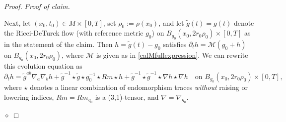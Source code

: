 \documentclass[12pt]{amsart}
\newcommand{\calM}{\mathcal{M}}
\renewcommand{\1}{{\mathbf 1}}
\newenvironment{claimproof}{\par\noindent\textit{Proof of claim.}\space}{\hfill$\diamond$\medskip\par}
\theoremstyle{others}
\numberwithin{equation}{section}
\begin{document}
\begin{proof}
\begin{claimproof}
    
        Next, let $(x_0, t_0) \in M \times [0, T]$, set $\rho_0 := \rho(x_0)$, and
        let $\tilde g(t) = g(t)$ denote the Ricci-DeTurck flow (with reference metric $g_0$) on $B_{g_0}(x_0, 2 r_0 \rho_0) \times [0,T]$ as in the statement of the claim.
        Then $h = \tilde  g(t) - g_0$ satisfies $\partial_t h = \calM(g_0 + h)$ on $B_{g_0}(x_0, 2 r_0 \rho_0)$, where $\calM$ is given as in \eqref{calMfullexpression}. 
        We can rewrite this evolution equation as
        \begin{equation} \label{proof local higher order est, eqn 1}
            \partial_t h = \tilde g^{ab} \nabla_a \nabla_b h + \tilde g^{-1} \star \tilde g \star g_0^{-1} \star Rm \star h + \tilde g^{-1} \star \tilde g^{-1} \star \nabla h \star \nabla h
            \quad \text{on } B_{g_0}(x_0, 2r_0 \rho_0) \times [0, T],
        \end{equation}
        where $\star$ denotes a linear combination of endomorphism traces \emph{without} raising or lowering indices, 
        $Rm= Rm_{g_0}$ is a (3,1)-tensor, and $\nabla = \nabla_{g_0}$.
        

\end{claimproof}
\end{proof}
\end{document}
